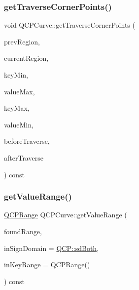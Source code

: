 \subsubsection{\texorpdfstring{getTraverseCornerPoints()}{getTraverseCornerPoints()}}
{\footnotesize\ttfamily void Q\+C\+P\+Curve\+::get\+Traverse\+Corner\+Points (\begin{DoxyParamCaption}\item[{int}]{prev\+Region,  }\item[{int}]{current\+Region,  }\item[{double}]{key\+Min,  }\item[{double}]{value\+Max,  }\item[{double}]{key\+Max,  }\item[{double}]{value\+Min,  }\item[{Q\+Vector$<$ Q\+PointF $>$ \&}]{before\+Traverse,  }\item[{Q\+Vector$<$ Q\+PointF $>$ \&}]{after\+Traverse }\end{DoxyParamCaption}) const\hspace{0.3cm}{\ttfamily [protected]}}

\mbox{\label{class_q_c_p_curve_a8bb8e3b9085f15921dc40483fb025ab2}} 
\subsubsection{\texorpdfstring{getValueRange()}{getValueRange()}}
{\footnotesize\ttfamily \mbox{\hyperlink{class_q_c_p_range}{Q\+C\+P\+Range}} Q\+C\+P\+Curve\+::get\+Value\+Range (\begin{DoxyParamCaption}\item[{bool \&}]{found\+Range,  }\item[{\mbox{\hyperlink{namespace_q_c_p_afd50e7cf431af385614987d8553ff8a9}{Q\+C\+P\+::\+Sign\+Domain}}}]{in\+Sign\+Domain = {\ttfamily \mbox{\hyperlink{namespace_q_c_p_afd50e7cf431af385614987d8553ff8a9aa38352ef02d51ddfa4399d9551566e24}{Q\+C\+P\+::sd\+Both}}},  }\item[{const \mbox{\hyperlink{class_q_c_p_range}{Q\+C\+P\+Range}} \&}]{in\+Key\+Range = {\ttfamily \mbox{\hyperlink{class_q_c_p_range}{Q\+C\+P\+Range}}()} }\end{DoxyParamCaption}) const\hspace{0.3cm}{\ttfamily [virtual]}}


